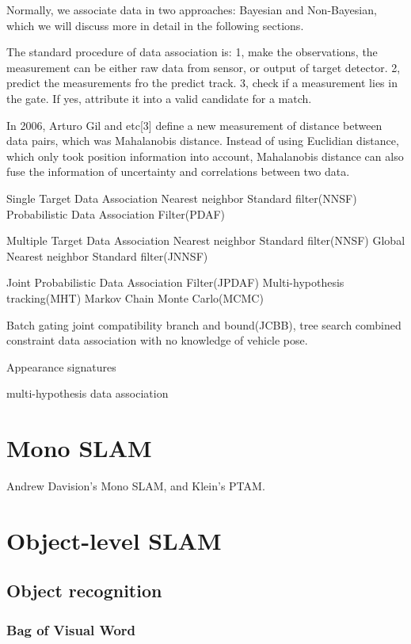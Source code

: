 Normally, we associate data in two approaches: Bayesian and Non-Bayesian, which we will discuss more in detail in the following sections.

The standard procedure of data association is:
	1, make the observations, the measurement can be either raw data from sensor, or output of target detector.
	2, predict the measurements fro the predict track.
	3, check if a measurement lies in the gate. If yes, attribute it into a valid candidate for a match.
	
	In 2006, Arturo Gil and etc[3] define a new measurement of distance between data pairs, which was Mahalanobis distance. Instead of using Euclidian distance, which only took position information into account, Mahalanobis distance can also fuse the information of uncertainty and correlations between two data.
	
Single Target Data Association
	Nearest neighbor Standard filter(NNSF)
	Probabilistic Data Association Filter(PDAF)

Multiple Target Data Association
	Nearest neighbor Standard filter(NNSF)
	Global Nearest neighbor Standard filter(JNNSF)
	
	Joint Probabilistic Data Association Filter(JPDAF)
	Multi-hypothesis tracking(MHT)
	Markov Chain Monte Carlo(MCMC)

	
	
Batch gating
	joint compatibility branch and bound(JCBB), tree search
	combined constraint data association with no knowledge of vehicle pose.

Appearance signatures

multi-hypothesis data association


\section{Mono SLAM}
Andrew Davision\rq{}s Mono SLAM, and  Klein\rq{}s PTAM.



\section{Object-level SLAM}
\subsection{Object recognition}

\subsubsection{Bag of Visual Word}
